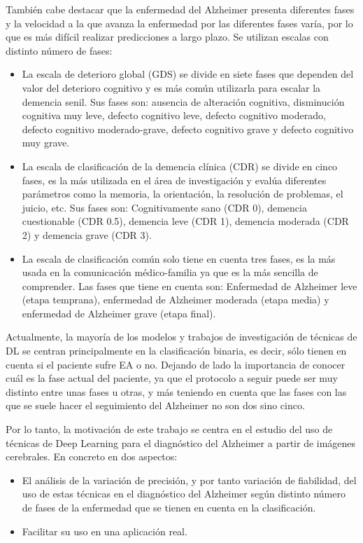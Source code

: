     También cabe destacar que la enfermedad del Alzheimer presenta diferentes fases y la velocidad a la que avanza la
    enfermedad por las diferentes fases varía, por lo que es más difícil realizar predicciones a largo plazo. Se utilizan
    escalas con distinto número de fases:
    \begin{itemize}
        \item La escala de deterioro global (GDS) se divide en siete fases que dependen del valor del deterioro cognitivo y es más común utilizarla para escalar la demencia senil. Sus fases son: ausencia de alteración cognitiva,  disminución cognitiva muy leve, defecto cognitivo leve, defecto cognitivo moderado, defecto cognitivo moderado-grave, defecto cognitivo grave y defecto cognitivo muy grave.
        \item La escala de clasificación de la demencia clínica (CDR)  se divide en cinco fases, es la más utilizada en el área de investigación y evalúa diferentes parámetros como la memoria, la orientación, la resolución de problemas, el juicio, etc. Sus fases son: Cognitivamente sano (CDR 0), demencia cuestionable (CDR 0.5), demencia leve (CDR 1), demencia moderada (CDR 2) y demencia grave (CDR 3).
        \item La escala de clasificación común solo tiene en cuenta tres fases, es la más usada en la comunicación médico-familia ya que es la más sencilla de comprender. Las fases que tiene en cuenta son: Enfermedad de Alzheimer leve (etapa temprana), enfermedad de Alzheimer moderada (etapa media) y enfermedad de Alzheimer grave (etapa final).\\
    \end{itemize}


    Actualmente, la mayoría de los modelos y  trabajos de investigación de técnicas de DL  se centran principalmente en la
    clasificación binaria, es decir, sólo tienen en cuenta si el paciente sufre EA o no. Dejando de lado la importancia de
    conocer cuál es la fase actual del paciente, ya que el protocolo a seguir puede ser muy distinto entre unas fases u
    otras, y más teniendo en cuenta que las fases con las que se suele hacer el seguimiento del Alzheimer no son dos sino
    cinco.

    Por lo tanto, la motivación de este trabajo se centra  en el estudio del uso de técnicas de Deep Learning para el
    diagnóstico del Alzheimer a partir de imágenes cerebrales. En concreto en dos aspectos:
    \begin{itemize}
        \item El análisis de la variación de precisión, y por tanto variación de fiabilidad, del uso de estas técnicas en el diagnóstico del Alzheimer según distinto número de fases de la enfermedad que se tienen en cuenta en la clasificación.
        \item Facilitar su uso en una aplicación real. \\
    \end{itemize}